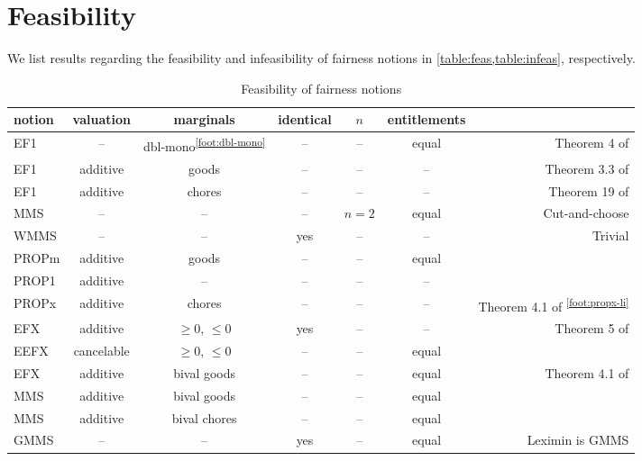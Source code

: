 \section{Feasibility}
\label{sec:feasibility}

We list results regarding the feasibility and infeasibility of fairness notions
in \cref{table:feas,table:infeas}, respectively.

\begin{table}[htb]
\centering
\caption{Feasibility of fairness notions}
\label{table:feas}
\begin{tabular}{lcccccr}
\toprule \scriptsize notion & \scriptsize valuation & \scriptsize marginals & \scriptsize identical & \scriptsize $n$ & \scriptsize entitlements &
\\ \midrule EF1 & -- & dbl-mono\textsuperscript{\ref{foot:dbl-mono}} & -- & -- & equal
    & Theorem 4 of \cite{bhaskar2021approximate}
\\[\defaultaddspace] EF1 & additive & goods & -- & -- & --
    & Theorem 3.3 of \cite{chakraborty2021weighted}
\\[\defaultaddspace] EF1 & additive & chores & -- & -- & --
    & Theorem 19 of \cite{springer2024almost}
\\[\defaultaddspace] MMS & -- & -- & -- & $n=2$ & equal
    & Cut-and-choose
\\[\defaultaddspace] WMMS & -- & -- & yes & -- & --
    & Trivial
\\[\defaultaddspace] PROPm & additive & goods & -- & -- & equal
    & \cite{baklanov2021propm}
\\[\defaultaddspace] PROP1 & additive & -- & -- & -- & --
    & \cite{aziz2020polynomial}
\\[\defaultaddspace] PROPx & additive & chores & -- & -- & --
    & Theorem 4.1 of \cite{li2022almost}\textsuperscript{\ref{foot:propx-li}}
\\[\defaultaddspace] EFX & additive & $\ge 0$, $\le 0$ & yes & -- & --
    & Theorem 5 of \cite{springer2024almost}
\\[\defaultaddspace] EEFX & cancelable & $\ge 0$, $\le 0$ & -- & -- & equal
    & \cite{caragiannis2023new,caragiannis2022existence}
\\[\defaultaddspace] EFX & additive & bival goods & -- & -- & equal
    & Theorem 4.1 of \cite{amanatidis2021maximum}
\\[\defaultaddspace] MMS & additive & bival goods & -- & -- & equal
    & \cite{feige2022maximin}
\\[\defaultaddspace] MMS & additive & bival chores & -- & -- & equal
    & \cite{feige2022maximin}
\\[\defaultaddspace] GMMS & -- & -- & yes & -- & equal
    & Leximin is GMMS
\\ \bottomrule
\end{tabular}


\end{table}
